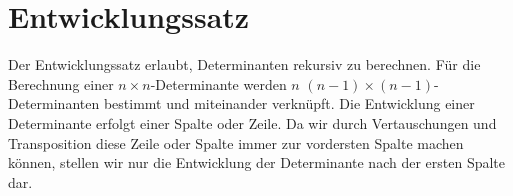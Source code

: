%
%
%
\section{Entwicklungssatz\label{entwicklungssatz}}
Der Entwicklungssatz erlaubt, Determinanten rekursiv zu berechnen.
Für die Berechnung einer $n\times n$-Determinante werden $n$
$(n-1)\times(n-1)$-Determinanten bestimmt und miteinander verknüpft.
Die Entwicklung einer Determinante erfolgt einer Spalte oder Zeile.
Da wir durch Vertauschungen und Transposition diese Zeile oder Spalte
immer zur vordersten Spalte machen können, stellen wir nur die
Entwicklung der Determinante nach der ersten Spalte dar.



